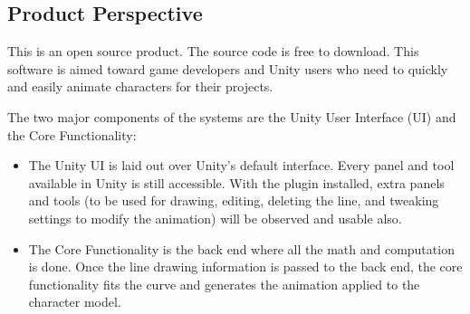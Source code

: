 \subsection{Product Perspective}
This is an open source product. The source code is free to download. This software is aimed toward game developers and Unity users who need to quickly and easily animate characters for their projects.

The two major components of the systems are the Unity User Interface (UI) and the Core Functionality:

\begin{itemize}
\item The Unity UI is laid out over Unity's default interface. Every panel and tool available in Unity is still accessible. With the plugin installed, extra panels and tools (to be used for drawing, editing, deleting the line, and tweaking settings to modify the animation) will be observed and usable also.

\item The Core Functionality is the back end where all the math and computation is done. Once the line drawing information is passed to the back end, the core functionality fits the curve and generates the animation applied to the character model.

\end{itemize}
